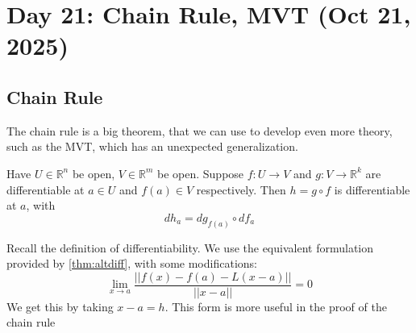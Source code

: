 \section{Day 21: Chain Rule, MVT (Oct 21, 2025)}

\subsection{Chain Rule}

The chain rule is a big theorem, that we can use to develop even more theory, such as the MVT, which has an unexpected generalization.

\begin{theorem} \label{thm:chainrule}
    Have $U \in \mathbb{R}^n$ be open, $V \in \mathbb{R}^m$ be open. Suppose $f : U \to V$ and $g: V \to \mathbb{R}^k$ are differentiable at $a \in U$ and $f(a) \in V$ respectively. Then $h = g \circ f$ is differentiable at $a$, with
    \[
    dh_a = dg_{f(a)} \circ df_a
    \]
\end{theorem}

\noindent Recall the definition of differentiability. We use the equivalent formulation provided by \ref{thm:altdiff}, with some modifications:
\[
\lim_{ x \to a } \frac{||f(x) - f(a) - L(x - a)||}{||x - a||} = 0
\]
We get this by taking $x - a = h$. This form is more useful in the proof of the chain rule

